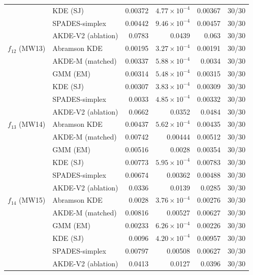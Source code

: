 \begin{tabular}{llrrrr}
 & KDE (SJ) & 0.00372 & $4.77\times10^{-4}$ & 0.00367 & 30/30 \\
 & SPADES-simplex & 0.00442 & $9.46\times10^{-4}$ & 0.00457 & 30/30 \\
 & AKDE-V2 (ablation) & 0.0783 & 0.0439 & 0.063 & 30/30 \\
$f_{12}$ (MW13) & Abramson KDE & 0.00195 & $3.27\times10^{-4}$ & 0.00191 & 30/30 \\
 & AKDE-M (matched) & 0.00337 & $5.88\times10^{-4}$ & 0.0034 & 30/30 \\
 & GMM (EM) & 0.00314 & $5.48\times10^{-4}$ & 0.00315 & 30/30 \\
 & KDE (SJ) & 0.00307 & $3.83\times10^{-4}$ & 0.00309 & 30/30 \\
 & SPADES-simplex & 0.0033 & $4.85\times10^{-4}$ & 0.00332 & 30/30 \\
 & AKDE-V2 (ablation) & 0.0662 & 0.0352 & 0.0484 & 30/30 \\
$f_{13}$ (MW14) & Abramson KDE & 0.00437 & $5.62\times10^{-4}$ & 0.00435 & 30/30 \\
 & AKDE-M (matched) & 0.00742 & 0.00444 & 0.00512 & 30/30 \\
 & GMM (EM) & 0.00516 & 0.0028 & 0.00354 & 30/30 \\
 & KDE (SJ) & 0.00773 & $5.95\times10^{-4}$ & 0.00783 & 30/30 \\
 & SPADES-simplex & 0.00674 & 0.00362 & 0.00488 & 30/30 \\
 & AKDE-V2 (ablation) & 0.0336 & 0.0139 & 0.0285 & 30/30 \\
$f_{14}$ (MW15) & Abramson KDE & 0.0028 & $3.76\times10^{-4}$ & 0.00276 & 30/30 \\
 & AKDE-M (matched) & 0.00816 & 0.00527 & 0.00627 & 30/30 \\
 & GMM (EM) & 0.00233 & $6.26\times10^{-4}$ & 0.00226 & 30/30 \\
 & KDE (SJ) & 0.0096 & $4.20\times10^{-4}$ & 0.00957 & 30/30 \\
 & SPADES-simplex & 0.00797 & 0.00508 & 0.00627 & 30/30 \\
 & AKDE-V2 (ablation) & 0.0413 & 0.0127 & 0.0396 & 30/30 \\
\bottomrule
\end{tabular}